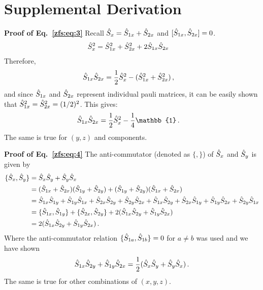 \section{Supplemental Derivation}

\textbf{Proof of Eq.~\ref{zfs:eq:3}}
Recall $\hat{S}_{x}=\hat{S}_{1x}+\hat{S}_{2x}$ and $[\hat{S}_{1x},\hat{S}_{2x}]=0$.
\begin{align}
    \hat{S}_{x}^2 &= \hat{S}_{1x}^2+\hat{S}_{2x}^2+2\hat{S}_{1x}\hat{S}_{2x}
\end{align}
Therefore,
\begin{align}
    \hat{S}_{1x}\hat{S}_{2x} &= \frac{1}{2} \hat{S}_{x}^2 - (\hat{S}_{1x}^2+\hat{S}_{2x}^2)\, ,
\end{align}
and since $\hat{S}_{1x}$ and $\hat{S}_{2x}$ represent individual pauli matrices, it can be easily shown that $\hat{S}_{1x}^2=\hat{S}_{2x}^2=(1/2)^2$. This gives:
\begin{align}
    \svar{1x}\svar{2x} &= \frac{1}{2} \svar{x}^2 - \frac{1}{4}\mathbb{1}\, .
\end{align}
The same is true for $(y,z)$ and components.


\textbf{Proof of Eq.~\ref{zfs:eq:4}}
The anti-commutator (denoted as $\{,\}$) of $\hat{S}_{x}$ and $\hat{S}_{y}$ is given by
\begin{align}
    \{\hat{S}_{x},\hat{S}_{y}\} &= \hat{S}_{x}\hat{S}_{y}+\hat{S}_{y}\hat{S}_{x} \nonumber \\
    &= (\hat{S}_{1x}+\hat{S}_{2x})(\hat{S}_{1y}+\hat{S}_{2y})+(\hat{S}_{1y}+\hat{S}_{2y})(\hat{S}_{1x}+\hat{S}_{2x}) \nonumber \\
    &=\hat{S}_{1x}\hat{S}_{1y}+\hat{S}_{1y}\hat{S}_{1x}+\hat{S}_{2x}\hat{S}_{2y}+\hat{S}_{2y}\hat{S}_{2x}
    +\hat{S}_{1x}\hat{S}_{2y}+\hat{S}_{2x}\hat{S}_{1y}+\hat{S}_{1y}\hat{S}_{2x}+\hat{S}_{2y}\hat{S}_{1x} \nonumber \\
    &= \{\hat{S}_{1x},\hat{S}_{1y}\} + \{\hat{S}_{2x},\hat{S}_{2y}\} +
    2(\hat{S}_{1x}\hat{S}_{2y}+\hat{S}_{1y}\hat{S}_{2x}) \nonumber \\
    &= 2(\hat{S}_{1x}\hat{S}_{2y}+\hat{S}_{1y}\hat{S}_{2x}) \, .
\end{align}
Where the anti-commutator relation $\{\hat{S}_{1a},\hat{S}_{1b}\}=0$ for $a\neq b$ was used and we have shown
\begin{align}
    \hat{S}_{1x}\hat{S}_{2y}+\hat{S}_{1y}\hat{S}_{2x} = \frac{1}{2}(\hat{S}_{x}\hat{S}_{y}+\hat{S}_{y}\hat{S}_{x}) \, .
\end{align}
The same is true for other combinations of $(x,y,z)$.


